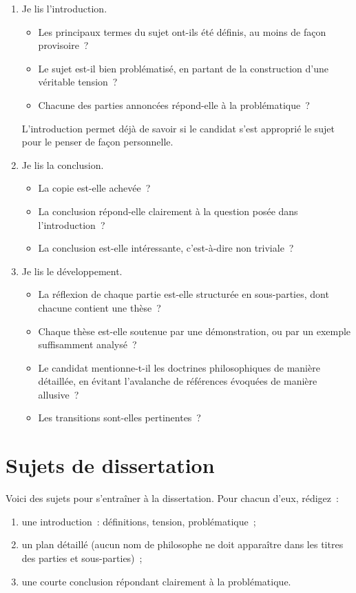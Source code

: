 \documentclass[a4paper,11pt]{article}
\begin{document}
\begin{enumerate}
\item Je lis l'introduction.
  \begin{itemize}
  \item Les principaux termes du sujet ont-ils été définis, au moins de
    façon provisoire~?
  \item Le sujet est-il bien problématisé, en partant de la construction
    d'une véritable tension~?
  \item Chacune des parties annoncées répond-elle à la problématique~?
  \end{itemize}
L'introduction permet déjà de savoir si le candidat s'est approprié le
sujet pour le penser de façon personnelle. 

\item Je lis la conclusion.
  \begin{itemize}
  \item La copie est-elle achevée~?
  \item La conclusion répond-elle clairement à la question posée dans
    l'introduction~?
  \item La conclusion est-elle intéressante, c'est-à-dire non triviale~?
  \end{itemize}

\item Je lis le développement.
  \begin{itemize}
  \item La réflexion de chaque partie est-elle structurée en
    sous-parties, dont chacune contient une thèse~?
  \item Chaque thèse est-elle soutenue par une démonstration, ou par un
    exemple suffisamment analysé~?
  \item Le candidat mentionne-t-il les doctrines philosophiques de
    manière détaillée, en évitant l'avalanche de références évoquées de
    manière allusive~?
  \item Les transitions sont-elles pertinentes~?
  \end{itemize}
\end{enumerate}


\section{Sujets de dissertation}

Voici des sujets pour s'entraîner à la dissertation. Pour chacun d'eux,
rédigez~:
\begin{enumerate}
\item une introduction~: définitions, tension, problématique~;
\item un plan détaillé (aucun nom de philosophe ne doit apparaître dans
  les titres des parties et sous-parties)~;
\item une courte conclusion répondant clairement à la problématique.
\end{enumerate}
\end{document}
